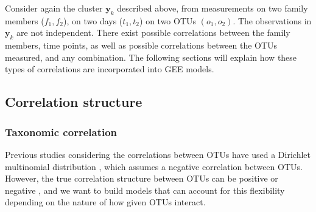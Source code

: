 \documentclass[12pt]{article}
\begin{document}
%
Consider again the cluster $\mathbf{y}_k$ described above, from measurements on two family members ($f_1,f_2$), on two days ($t_1, t_2$) on two OTUs $(o_1,o_2)$. The observations in $\mathbf{y}_k$ are not independent. There exist possible correlations between the family members, time points, as well as possible correlations between the OTUs measured, and any combination. The following sections will explain how these types of correlations are incorporated into GEE models.

\subsection{Correlation structure }
\subsubsection{Taxonomic correlation}
Previous studies considering the correlations between OTUs have used a Dirichlet multinomial distribution \cite{la2012hypothesis}, which assumes a negative correlation between OTUs. However, the true correlation structure between OTUs can be positive or negative \cite{mandal2015analysis}, and we want to build models that can account for this flexibility depending on the nature of how given OTUs interact.
\end{document}
